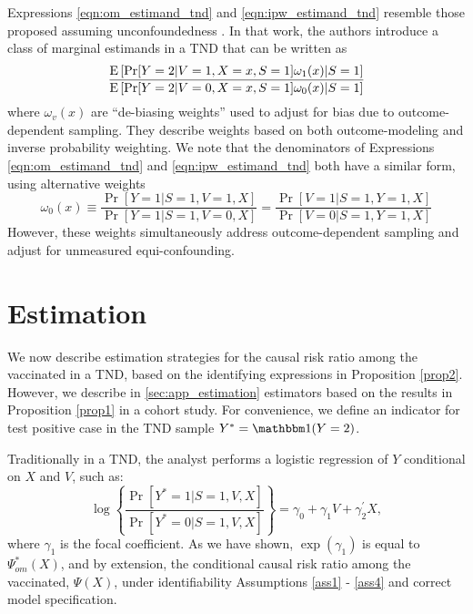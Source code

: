 \documentclass[11pt]{article}
\begin{document}
 \begin{remark}
     Expressions \ref{eqn:om_estimand_tnd} and  \ref{eqn:ipw_estimand_tnd} resemble those proposed assuming unconfoundedness \cite{jiang_tnddr_2023}. In that work, the authors introduce a class of marginal estimands in a TND that can be written as 
     \begin{equation*}
         \dfrac{\operatorname{E}\left[\Pr[Y=2 | V = 1, X = x, S = 1]\omega_1(x) | S = 1 \right]}{\operatorname{E}\left[\Pr[Y=2 | V = 0, X = x, S = 1]\omega_0(x) | S = 1\right]}
     \end{equation*}
     where $\omega_v(x)$ are ``de-biasing weights'' used to adjust for bias due to outcome-dependent sampling. They describe weights based on both outcome-modeling and inverse probability weighting. We note that the denominators of Expressions \ref{eqn:om_estimand_tnd} and  \ref{eqn:ipw_estimand_tnd} both have a similar form, using alternative weights 
     \begin{equation*}
         \omega_0(x) \equiv \dfrac{\Pr[Y = 1 | S = 1, V = 1, X]}{\Pr[Y=1| S = 1, V = 0, X]} = \dfrac{\Pr[V=1 | S = 1, Y = 1, X]}{\Pr[V=0| S = 1, Y = 1, X]}
     \end{equation*}
     However, these weights simultaneously address outcome-dependent sampling and adjust for unmeasured equi-confounding. 
 \end{remark}

\section*{Estimation}\label{sec:estimation}
We now describe estimation strategies for the causal risk ratio among the vaccinated in a TND, based on the identifying expressions in Proposition \ref{prop2}. However, we describe in \ref{sec:app_estimation} estimators based on the results in Proposition \ref{prop1} in a cohort study. For convenience, we define an indicator for test positive case in the TND sample $Y^* = \mathbbm 1 (Y = 2)$.

Traditionally in a TND, the analyst performs a logistic regression of $Y$ conditional on $X$ and $V$, such as:
$$\log \left\{\dfrac{\Pr[Y^*=1 | S = 1, V, X]}{\Pr[Y^* = 0 | S = 1, V, X]}\right\} = \gamma_0 + \gamma_1 V + \gamma_2^\prime X,$$
where $\gamma_1$ is the focal coefficient. As we have shown, $\exp(\gamma_1)$ is equal to $\Psi^*_{om}(X)$, and by extension, the conditional causal risk ratio among the vaccinated, $\Psi(X)$, under identifiability Assumptions \ref{ass1} - \ref{ass4} and correct model specification. 
\end{document}
